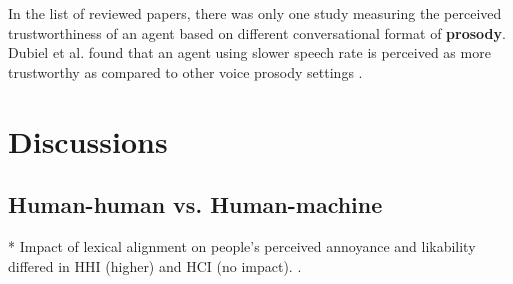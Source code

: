 \documentclass[sigconf,screen,review, anonymous]{acmart}
\newcommand{\cmt}[1]{}%
\begin{document}




In the list of reviewed papers, there was only one study measuring the perceived trustworthiness of an agent based on different conversational format of \textbf{prosody}. Dubiel et al. found that an agent using slower speech rate is perceived as more trustworthy as compared to other voice prosody settings \cite{dubiel2020persuasive}\cmt{[60]}.



\section{Discussions}

\subsection{Human-human vs. Human-machine}

* Impact of lexical alignment on people's perceived annoyance and likability differed in HHI (higher) and HCI (no impact). \cite{huiyang2022improving}\cmt{[17]}.
\end{document}
